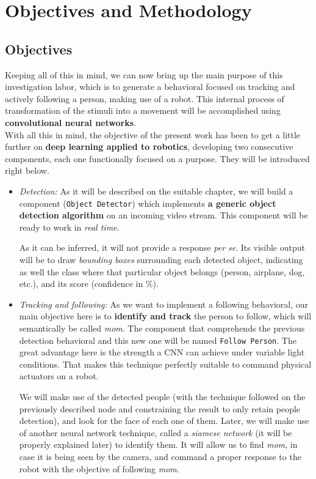 \chapter{Objectives and Methodology}

\section{Objectives}

Keeping all of this in mind, we can now bring up the main purpose of this investigation labor, which is to generate a behavioral focused on tracking and actively following a person, making use of a robot. This internal process of transformation of the stimuli into a movement will be accomplished using \textbf{convolutional neural networks}.\\

With all this in mind, the objective of the present work has been to get a little further on \textbf{deep learning applied to robotics}, developing two consecutive components, each one functionally focused on a purpose. They will be introduced right below.
	\begin{itemize}
		\item \textit{Detection:} As it will be described on the suitable chapter, we will build a component (\texttt{Object Detector}) which implements \textbf{a generic object detection algorithm} on an incoming video stream. This component will be ready to work in \emph{real time}.
		
		As it can be inferred, it will not provide a response \textit{per se}. Its visible output will be to draw \emph{bounding boxes} surrounding each detected object, indicating as well the class where that particular object belongs (person, airplane, dog, etc.), and its score (confidence in \%).
		
		\item \textit{Tracking and following:} As we want to implement a following behavioral, our main objective here is to \textbf{identify and track} the person to follow, which will semantically be called \emph{mom}. The component that comprehends the previous detection behavioral and this new one will be named \texttt{Follow Person}. The great advantage here is the strength a CNN can achieve under variable light conditions. That makes this technique perfectly suitable to command physical actuators on a robot.
		
		We will make use of the detected people (with the technique followed on the previously described node and constraining the result to only retain people detection), and look for the face of each one of them. Later, we will make use of another neural network technique, called a \emph{siamese network} (it will be properly explained later) to identify them. It will allow us to find \emph{mom}, in case it is being seen by the camera, and command a proper response to the robot with the objective of following \emph{mom}.
	\end{itemize}

